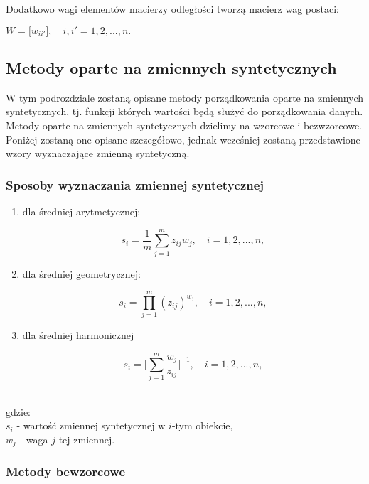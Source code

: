 \documentclass[12pt,a4paper]{report}
\begin{document}
Dodatkowo wagi elementów macierzy odległości tworzą macierz wag postaci:

\begin{center}
$W=\lbrack{w_{ii'}\rbrack},\quad i,i'=1, 2, ..., n.$
\end{center}



\newpage
\subsection{Metody oparte na zmiennych syntetycznych}

W tym podrozdziale zostaną opisane metody porządkowania oparte na zmiennych syntetycznych, tj. funkcji których wartości będą służyć do porządkowania danych. Metody oparte na zmiennych syntetycznych dzielimy na wzorcowe i bezwzorcowe. Poniżej zostaną one opisane szczegółowo, jednak wcześniej zostaną przedstawione wzory wyznaczające zmienną syntetyczną. \\

\subsubsection{Sposoby wyznaczania zmiennej syntetycznej}

\begin{enumerate}
\item dla średniej arytmetycznej:
\begin{center}
$$s_{i}=\frac{1}{m} \sum_{j=1}^{m} z_{ij}w_{j},  \quad i=1, 2, ..., n,$$
\end{center}
\item dla średniej geometrycznej:
\begin{center}
$$s_{i}=\prod_{j=1}^{m} (z_{ij})^{w_{j}}, \quad i=1, 2, ..., n,$$
\end{center}
\item dla średniej harmonicznej
\begin{center}
$$s_{i}=\big[\sum_{j=1}^{m} \frac{w_{j}}{z_{ij}}\big]^{-1}, \quad i=1, 2, ..., n,$$\\
\end{center}
\end{enumerate}
gdzie:\\
$s_{i}$ - wartość zmiennej syntetycznej w $i$-tym obiekcie,\\
$w_{j}$ - waga $j$-tej zmiennej.

\subsubsection{Metody bewzorcowe}
\noindent
\end{document}
